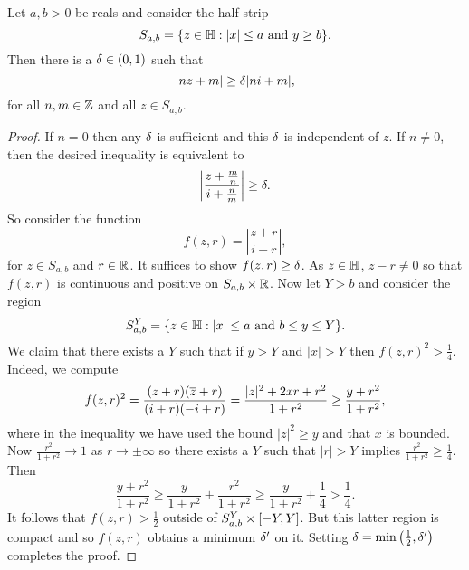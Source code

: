     \begin{lemma}\label{lem:technical_Eisenstein_convergence_lemma}
      Let $a,b > 0$ be reals and consider the half-strip
      \[
        S_{a,b} = \{z \in \mathbb{H}:\text{$|x| \le a$ and $y \ge b$}\}.
      \]
      Then there is a $\delta \in (0,1)$ such that
      \[
        |nz+m| \ge \delta|ni+m|,
      \]
      for all $n,m \in \mathbb{Z}$ and all $z \in S_{a,b}$.
    \end{lemma}
    \begin{proof}
      If $n = 0$ then any $\delta$ is sufficient and this $\delta$ is independent of $z$. If $n \neq 0$, then the desired inequality is equivalent to
      \[
        \left|\frac{z+\frac{m}{n}}{i+\frac{n}{m}}\right| \ge \delta.
      \]
      So consider the function
      \[
        f(z,r) = \left|\frac{z+r}{i+r}\right|,
      \]
      for $z \in S_{a,b}$ and $r \in \mathbb{R}$. It suffices to show $f(z,r) \ge \delta$. As $z \in \mathbb{H}$, $z-r \neq 0$ so that $f(z,r)$ is continuous and positive on $S_{a,b} \times \mathbb{R}$. Now let $Y > b$ and consider the region
      \[
        S_{a,b}^{Y} = \{z \in \mathbb{H}:\text{$|x| \le a$ and $b \le y \le Y$}\}.
      \]
      We claim that there exists a $Y$ such that if $y > Y$ and $|x| > Y$ then $f(z,r)^{2} > \frac{1}{4}$. Indeed, we compute
      \[
        f(z,r)^{2} = \frac{(z+r)(\overline{z}+r)}{(i+r)(-i+r)} = \frac{|z|^{2}+2xr+r^{2}}{1+r^{2}} \ge \frac{y+r^{2}}{1+r^{2}},
      \]
      where in the inequality we have used the bound $|z|^{2} \ge y$ and that $x$ is bounded. Now $\frac{r^{2}}{1+r^{2}} \to 1$ as $r \to \pm\infty$ so there exists a $Y$ such that $|r| > Y$ implies $\frac{r^{2}}{1+r^{2}} \ge \frac{1}{4}$. Then
      \[
        \frac{y+r^{2}}{1+r^{2}} \ge \frac{y}{1+r^{2}}+\frac{r^{2}}{1+r^{2}} \ge \frac{y}{1+r^{2}}+\frac{1}{4} > \frac{1}{4}.
      \]
      It follows that $f(z,r) > \frac{1}{2}$ outside of $S_{a,b}^{Y} \times [-Y,Y]$. But this latter region is compact and so $f(z,r)$ obtains a minimum $\delta'$ on it. Setting $\delta = \min\left(\frac{1}{2},\delta'\right)$ completes the proof.
    \end{proof}

